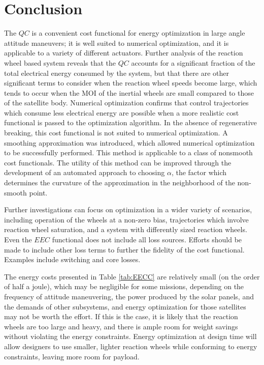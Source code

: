 \documentclass[letterpaper, paper,11pt]{AAS}
\begin{document}
\section{Conclusion}
The $QC$ is a convenient cost functional for energy optimization in large angle attitude maneuvers; it is well suited to numerical optimization, and it is applicable to a variety of different actuators. Further analysis of the reaction wheel based system reveals that the $QC$ accounts for a significant fraction of the total electrical energy consumed by the system, but that there are other significant terms to consider when the reaction wheel speeds become large, which tends to occur when the MOI of the inertial wheels are small compared to those of the satellite body. Numerical optimization confirms that control trajectories which consume less electrical energy are possible when a more realistic cost functional is passed to the optimization algorithm. In the absence of regenerative breaking, this cost functional is not suited to numerical optimization. A smoothing approximation was introduced, which allowed numerical optimization to be successfully performed. This method is applicable to a class of nonsmooth cost functionals. The utility of this method can be improved through the development of an automated approach to choosing $\alpha$, the factor which determines the curvature of the approximation in the neighborhood of the non-smooth point. 

Further investigations can focus on optimization in a wider variety of scenarios, including operation of the wheels at a non-zero bias, trajectories which involve reaction wheel saturation, and a system with differently sized reaction wheels. Even the $EEC$ functional does not include all loss sources. Efforts should be made to include other loss terms to further the fidelity of the cost functional. Examples include switching and core losses.

The energy costs presented in Table \ref{tab:EECC} are relatively small (on the order of half a joule), which may be negligible for some missions, depending on the frequency of attitude maneuvering, the power produced by the solar panels, and the demands of other subsystems, and energy optimization for those satellites may not be worth the effort. If this is the case, it is likely that the reaction wheels are too large and heavy, and there is ample room for weight savings without violating the energy constraints. Energy optimization at design time will allow designers to use smaller, lighter reaction wheels while conforming to energy constraints, leaving more room for payload.
\end{document}
